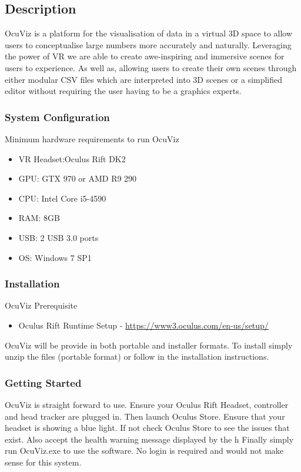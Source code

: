 \documentclass[a4paper,12pt]{article}
\newcommand\tab[1][1cm]{\hspace*{#1}}
\begin{document}
\subsection{Description}

OcuViz is a platform for the visualisation of data in a virtual 3D space to allow users to conceptualise large numbers more accurately and naturally. Leveraging the power of VR we are able to create awe-inspiring and immersive scenes for users to experience. As well as, allowing users to create their own scenes through either modular CSV files which are interpreted into 3D scenes or a simplified editor without requiring the user having to be a graphics experts.

\subsubsection{System Configuration}

Minimum hardware requirements to run OcuViz
\begin{itemize}
\item VR Headset:\tab Oculus Rift DK2
\item GPU:\tab[2.1cm] GTX 970 or AMD R9 290
\item CPU:\tab[2.2cm] Intel Core i5-4590
\item RAM:\tab[2.1cm] 8GB
\item USB:\tab[2.3cm] 2 USB 3.0 ports
\item OS:\tab[2.6cm] Windows 7 SP1
\end{itemize}

\subsubsection{Installation}
OcuViz Prerequisite
\begin{itemize}
\item Oculus Rift Runtime Setup - \url{https://www3.oculus.com/en-us/setup/}
\end{itemize}

OcuViz will be provide in both portable and installer formats. To install simply unzip the files (portable format) or follow in the installation instructions.

\subsubsection{Getting Started}
OcuViz is straight forward to use. Ensure your Oculus Rift Headset, controller and head tracker are plugged in. Then launch Oculus Store. Ensure that your headset is showing a blue light. If not check Oculus Store to see the issues that exist. Also accept the health warning message displayed by the h Finally simply run OcuViz.exe to use the software. No login is required and would not make sense for this system.
\end{document}

